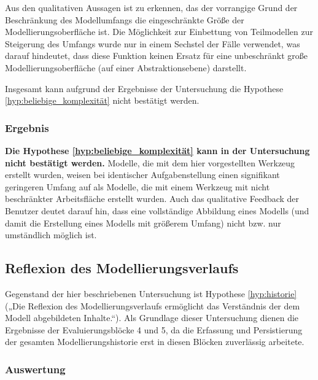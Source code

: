 Aus den qualitativen Aussagen ist zu erkennen, das der vorrangige Grund der Beschränkung des Modellumfangs die eingeschränkte Größe der Modellierungsoberfläche ist. Die Möglichkeit zur Einbettung von Teilmodellen zur Steigerung des Umfangs wurde nur in einem Sechstel der Fälle verwendet, was darauf hindeutet, dass diese Funktion keinen Ersatz für eine unbeschränkt große Modellierungsoberfläche (auf einer Abstraktionsebene) darstellt.

Insgesamt kann aufgrund der Ergebnisse der Untersuchung die Hypothese \ref{hyp:beliebige_komplexität} nicht bestätigt werden.

\subsubsection{Ergebnis} %

\textbf{Die Hypothese \ref{hyp:beliebige_komplexität} kann in der Untersuchung nicht bestätigt werden.} Modelle, die mit dem hier vorgestellten Werkzeug erstellt wurden, weisen bei identischer Aufgabenstellung einen signifikant geringeren Umfang auf als Modelle, die mit einem Werkzeug mit nicht beschränkter Arbeitsfläche erstellt wurden. Auch das qualitative Feedback der Benutzer deutet darauf hin, dass eine vollständige Abbildung eines Modells (und damit die Erstellung eines Modells mit größerem Umfang) nicht bzw. nur umständlich möglich ist.



\subsection{Reflexion des Modellierungsverlaufs} %
\label{sub:reflexion_des_modellierungsverlaufs}

Gegenstand der hier beschriebenen Untersuchung ist Hypothese \ref{hyp:historie} („Die Reflexion des Modellierungsverlaufs ermöglicht das Verständnis der dem Modell abgebildeten Inhalte.“). Als Grundlage dieser Untersuchung dienen die Ergebnisse der Evaluierungsblöcke 4 und 5, da die Erfassung und Persistierung der gesamten Modellierungshistorie erst in diesen Blöcken zuverlässig arbeitete.

\subsubsection{Auswertung} 
 
